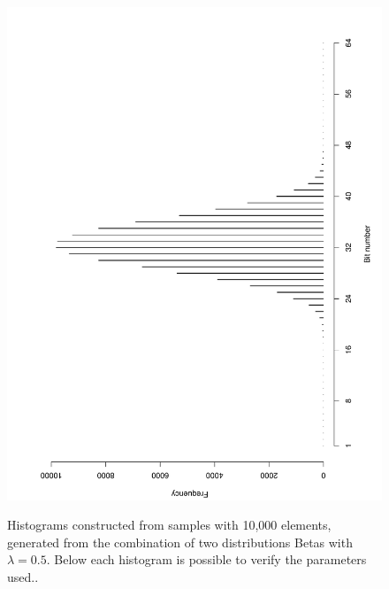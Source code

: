 \documentclass[10pt]{article}
\begin{document}
\begin{figure}[h]
{  \includegraphics[scale=0.28,angle=-90]{fig12}
  }
  \caption{Histograms constructed from samples with 10,000 elements, generated from the combination of two distributions Betas with $\lambda=0.5$. Below each histogram is possible to verify the parameters used..}
  \label{fig:09101112}
\end{figure}
\end{document}
